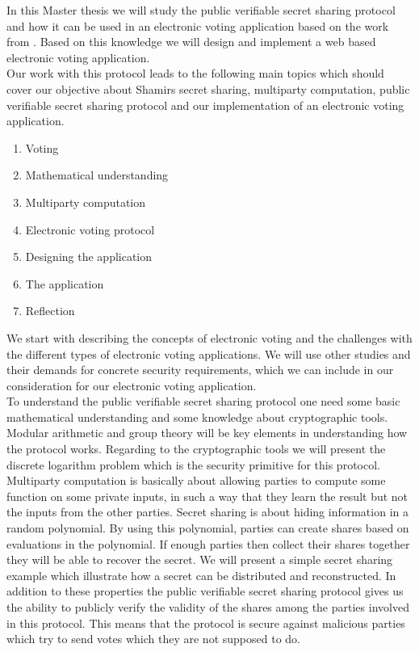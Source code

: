 In this Master thesis we will study the public verifiable secret sharing protocol and how it can be used in an electronic voting application based on the work from \cite{Schoenmakers1999}. Based on this knowledge we will design and implement a web based electronic voting application.\\

\noindent
Our work with this protocol leads to the following main topics which should cover our objective about Shamirs secret sharing, multiparty computation, public verifiable secret sharing protocol and our implementation of an electronic voting application.

\begin{enumerate}
    \item Voting
    \item Mathematical understanding
    \item Multiparty computation
    \item Electronic voting protocol
    \item Designing the application
    \item The application
    \item Reflection
\end{enumerate}

\noindent
We start with describing the concepts of electronic voting and the challenges with the different types of electronic voting applications. We will use other studies and their demands for concrete security requirements, which we can include in our consideration for our electronic voting application.  \\

\noindent
To understand the public verifiable secret sharing protocol one need some basic mathematical understanding and some knowledge about cryptographic tools. Modular arithmetic and group theory will be key elements in understanding how the protocol works. Regarding to the cryptographic tools we will present the discrete logarithm problem which is the security primitive for this protocol.\\

\noindent
Multiparty computation is basically about allowing parties to compute some function on some private inputs, in such a way that they learn the result but not the inputs from the other parties. Secret sharing is about hiding information in a random polynomial. By using this polynomial, parties can create shares based on evaluations in the polynomial. If enough parties then collect their shares together they will be able to recover the secret.  We will present a simple secret sharing example which illustrate how a secret can be distributed and reconstructed. In addition to these properties the public verifiable secret sharing protocol gives us the ability to publicly verify the validity of the shares among the parties involved in this protocol. This means that the protocol is secure against malicious parties which try to send votes which they are not supposed to do. \\

